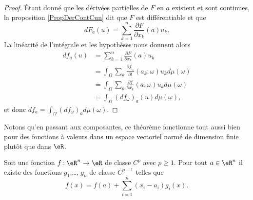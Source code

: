 \begin{proof}
    Étant donné que les dérivées partielles de \( F\) en \( a\) existent et sont continues, la proposition \ref{PropDerContCun} dit que \( F\) est différentiable et que
    \begin{equation}
        dF_a(u)=\sum_{k=1}^n\frac{ \partial F }{ \partial x_k }(a)u_k.
    \end{equation}
    La linéarité de l'intégrale et les hypothèses nous donnent alors
    \begin{subequations}
        \begin{align}
            df_a(u)&=\sum_{k=1}^n\frac{ \partial F }{ \partial x_k }(a)u_k\\
            &=\int_{\Omega}\sum_k\frac{ \partial f_{|_k} }{ \partial t }(a_k;\omega)u_kd\mu(\omega)\\
            &=\int_{\Omega}\sum_k\frac{ \partial f }{ \partial x_k }(a;\omega)u_kd\mu(\omega)\\
            &=\int_{\Omega}(df_{\omega})_a(u)d\mu(\omega),
        \end{align}
    \end{subequations}
    et donc \( df_a=\int_{\Omega}(df_{\omega})_ad\mu(\omega)\).
\end{proof}
Notons qu'en passant aux composantes, ce théorème fonctionne tout aussi bien pour des fonctions à valeurs dans un espace vectoriel normé de dimension finie plutôt que dans \( \eR\).

\begin{lemma}   \label{LemWNBooGPlIwT}
    Soit une fonction \( f\colon \eR^n\to \eR\) de classe \( C^p\) avec \( p\geq 1\). Pour tout \( a\in \eR^n\) il existe des fonctions \( g_1\),\ldots, \( g_n\) de classe \( C^{p-1}\) telles que
    \begin{equation}
        f(x)=f(a)+\sum_{i=1}^n(x_i-a_i)g_i(x).
    \end{equation}
\end{lemma}


